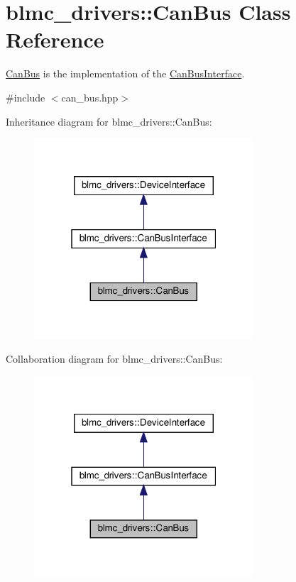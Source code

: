 \hypertarget{classblmc__drivers_1_1CanBus}{}\section{blmc\+\_\+drivers\+:\+:Can\+Bus Class Reference}
\label{classblmc__drivers_1_1CanBus}


\hyperlink{classblmc__drivers_1_1CanBus}{Can\+Bus} is the implementation of the \hyperlink{classblmc__drivers_1_1CanBusInterface}{Can\+Bus\+Interface}.  




{\ttfamily \#include $<$can\+\_\+bus.\+hpp$>$}



Inheritance diagram for blmc\+\_\+drivers\+:\+:Can\+Bus\+:
\nopagebreak
\begin{figure}[H]
\begin{center}
\leavevmode
\includegraphics[width=232pt]{classblmc__drivers_1_1CanBus__inherit__graph}
\end{center}
\end{figure}


Collaboration diagram for blmc\+\_\+drivers\+:\+:Can\+Bus\+:
\nopagebreak
\begin{figure}[H]
\begin{center}
\leavevmode
\includegraphics[width=232pt]{classblmc__drivers_1_1CanBus__coll__graph}
\end{center}
\end{figure}
